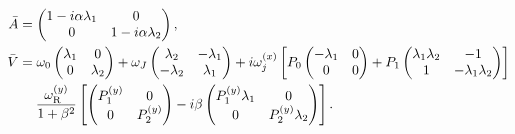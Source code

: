 \begin{subequations}
\begin{align}
    \bar{A} &=
    \begin{pmatrix}
     1-i\alpha\lambda_1 & 0 \\
     0 & 1-i\alpha\lambda_2
    \end{pmatrix}, \\
    \nonumber\bar{V} &=
    \omega_0\begin{pmatrix}
     \lambda_1 & 0 \\
     0 & \lambda_2
    \end{pmatrix}
    + \omega_J \begin{pmatrix}
     \lambda_2 & -\lambda_1 \\
     -\lambda_2 & \lambda_1
    \end{pmatrix}
    + i\omega_j^{(x)}\left[P_0
    \begin{pmatrix}
     -\lambda_1 & 0 \\
     0 & 0
    \end{pmatrix}
    + P_1
    \begin{pmatrix}
     \lambda_1\lambda_2 & -1 \\
     1 & -\lambda_1\lambda_2
    \end{pmatrix}\right] \\
    &\hspace{4.5mm} \frac{\omega_{\text{R}}^{(y)}}{1+\beta^2}\left[
    \begin{pmatrix}
     P_1^{(y)} & 0 \\
     0 & P_2^{(y)}
    \end{pmatrix}
    - i \beta
    \begin{pmatrix}
     P_1^{(y)}\lambda_1 & 0 \\
     0 & P_2^{(y)}\lambda_2
    \end{pmatrix}\right].
\end{align}
\end{subequations}

